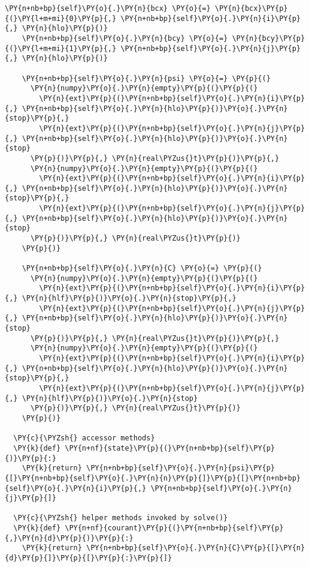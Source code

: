\begin{Verbatim}[commandchars=\\\{\}]
    \PY{n+nb+bp}{self}\PY{o}{.}\PY{n}{bcx} \PY{o}{=} \PY{n}{bcx}\PY{p}{(}\PY{l+m+mi}{0}\PY{p}{,} \PY{n+nb+bp}{self}\PY{o}{.}\PY{n}{i}\PY{p}{,} \PY{n}{hlo}\PY{p}{)}
    \PY{n+nb+bp}{self}\PY{o}{.}\PY{n}{bcy} \PY{o}{=} \PY{n}{bcy}\PY{p}{(}\PY{l+m+mi}{1}\PY{p}{,} \PY{n+nb+bp}{self}\PY{o}{.}\PY{n}{j}\PY{p}{,} \PY{n}{hlo}\PY{p}{)}

    \PY{n+nb+bp}{self}\PY{o}{.}\PY{n}{psi} \PY{o}{=} \PY{p}{(}
      \PY{n}{numpy}\PY{o}{.}\PY{n}{empty}\PY{p}{(}\PY{p}{(}
        \PY{n}{ext}\PY{p}{(}\PY{n+nb+bp}{self}\PY{o}{.}\PY{n}{i}\PY{p}{,} \PY{n+nb+bp}{self}\PY{o}{.}\PY{n}{hlo}\PY{p}{)}\PY{o}{.}\PY{n}{stop}\PY{p}{,} 
        \PY{n}{ext}\PY{p}{(}\PY{n+nb+bp}{self}\PY{o}{.}\PY{n}{j}\PY{p}{,} \PY{n+nb+bp}{self}\PY{o}{.}\PY{n}{hlo}\PY{p}{)}\PY{o}{.}\PY{n}{stop}
      \PY{p}{)}\PY{p}{,} \PY{n}{real\PYZus{}t}\PY{p}{)}\PY{p}{,}
      \PY{n}{numpy}\PY{o}{.}\PY{n}{empty}\PY{p}{(}\PY{p}{(}
        \PY{n}{ext}\PY{p}{(}\PY{n+nb+bp}{self}\PY{o}{.}\PY{n}{i}\PY{p}{,} \PY{n+nb+bp}{self}\PY{o}{.}\PY{n}{hlo}\PY{p}{)}\PY{o}{.}\PY{n}{stop}\PY{p}{,} 
        \PY{n}{ext}\PY{p}{(}\PY{n+nb+bp}{self}\PY{o}{.}\PY{n}{j}\PY{p}{,} \PY{n+nb+bp}{self}\PY{o}{.}\PY{n}{hlo}\PY{p}{)}\PY{o}{.}\PY{n}{stop}
      \PY{p}{)}\PY{p}{,} \PY{n}{real\PYZus{}t}\PY{p}{)}
    \PY{p}{)}

    \PY{n+nb+bp}{self}\PY{o}{.}\PY{n}{C} \PY{o}{=} \PY{p}{(}
      \PY{n}{numpy}\PY{o}{.}\PY{n}{empty}\PY{p}{(}\PY{p}{(}
        \PY{n}{ext}\PY{p}{(}\PY{n+nb+bp}{self}\PY{o}{.}\PY{n}{i}\PY{p}{,} \PY{n}{hlf}\PY{p}{)}\PY{o}{.}\PY{n}{stop}\PY{p}{,} 
        \PY{n}{ext}\PY{p}{(}\PY{n+nb+bp}{self}\PY{o}{.}\PY{n}{j}\PY{p}{,} \PY{n+nb+bp}{self}\PY{o}{.}\PY{n}{hlo}\PY{p}{)}\PY{o}{.}\PY{n}{stop}
      \PY{p}{)}\PY{p}{,} \PY{n}{real\PYZus{}t}\PY{p}{)}\PY{p}{,}
      \PY{n}{numpy}\PY{o}{.}\PY{n}{empty}\PY{p}{(}\PY{p}{(}
        \PY{n}{ext}\PY{p}{(}\PY{n+nb+bp}{self}\PY{o}{.}\PY{n}{i}\PY{p}{,} \PY{n+nb+bp}{self}\PY{o}{.}\PY{n}{hlo}\PY{p}{)}\PY{o}{.}\PY{n}{stop}\PY{p}{,} 
        \PY{n}{ext}\PY{p}{(}\PY{n+nb+bp}{self}\PY{o}{.}\PY{n}{j}\PY{p}{,} \PY{n}{hlf}\PY{p}{)}\PY{o}{.}\PY{n}{stop}
      \PY{p}{)}\PY{p}{,} \PY{n}{real\PYZus{}t}\PY{p}{)}
    \PY{p}{)}

  \PY{c}{\PYZsh{} accessor methods}
  \PY{k}{def} \PY{n+nf}{state}\PY{p}{(}\PY{n+nb+bp}{self}\PY{p}{)}\PY{p}{:}
    \PY{k}{return} \PY{n+nb+bp}{self}\PY{o}{.}\PY{n}{psi}\PY{p}{[}\PY{n+nb+bp}{self}\PY{o}{.}\PY{n}{n}\PY{p}{]}\PY{p}{[}\PY{n+nb+bp}{self}\PY{o}{.}\PY{n}{i}\PY{p}{,} \PY{n+nb+bp}{self}\PY{o}{.}\PY{n}{j}\PY{p}{]}

  \PY{c}{\PYZsh{} helper methods invoked by solve()}
  \PY{k}{def} \PY{n+nf}{courant}\PY{p}{(}\PY{n+nb+bp}{self}\PY{p}{,}\PY{n}{d}\PY{p}{)}\PY{p}{:}
    \PY{k}{return} \PY{n+nb+bp}{self}\PY{o}{.}\PY{n}{C}\PY{p}{[}\PY{n}{d}\PY{p}{]}\PY{p}{[}\PY{p}{:}\PY{p}{]}


\end{Verbatim}
